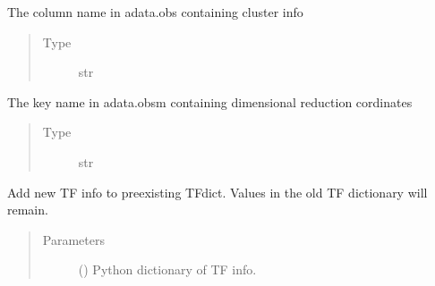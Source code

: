 \documentclass[letterpaper,10pt,english]{sphinxmanual}
\begin{document}
\begin{fulllineitems}
\begin{fulllineitems}
\begin{quote}
\begin{description}
\end{description}\end{quote}

\end{fulllineitems}


\begin{fulllineitems}
\label{\detokenize{modules/celloracle:celloracle.Oracle.cluster_column_name}}
The column name in adata.obs containing cluster info
\begin{quote}\begin{description}
\item[{Type}] \leavevmode
str

\end{description}\end{quote}

\end{fulllineitems}


\begin{fulllineitems}
\label{\detokenize{modules/celloracle:celloracle.Oracle.embedding_name}}
The key name in adata.obsm containing dimensional reduction cordinates
\begin{quote}\begin{description}
\item[{Type}] \leavevmode
str

\end{description}\end{quote}

\end{fulllineitems}


\begin{fulllineitems}
\label{\detokenize{modules/celloracle:celloracle.Oracle.addTFinfo_dictionary}}
Add new TF info to pre\sphinxhyphen{}existing TFdict.
Values in the old TF dictionary will remain.
\begin{quote}\begin{description}
\item[{Parameters}] \leavevmode
{} () \textendash{} Python dictionary of TF info.


\end{description}
\end{quote}
\end{fulllineitems}
\end{fulllineitems}
\end{document}
